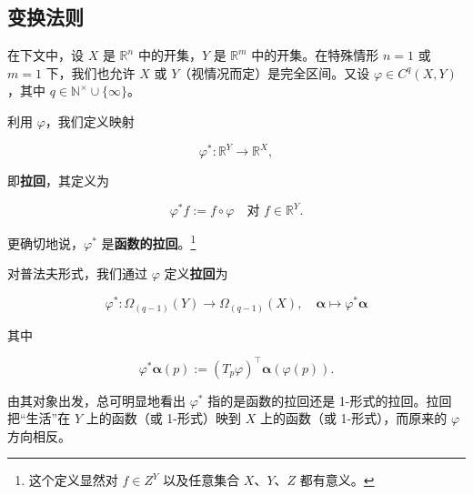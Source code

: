\subsection*{变换法则}

在下文中，设 $ X $ 是 $ \mathbb{R}^{n} $ 中的开集，$ Y $ 是 $ \mathbb{R}^{m} $ 中的开集。在特殊情形 $ n = 1 $ 或 $ m = 1 $ 下，我们也允许 $ X $ 或 $ Y $（视情况而定）是完全区间。又设 $ \varphi \in C^{q}(X,Y) $，其中 $ q \in \mathbb{N}^{\times} \cup \{\infty\} $。

利用 $ \varphi $，我们定义映射

\[
\varphi^{*} : \mathbb{R}^{Y} \to \mathbb{R}^{X} ,
\]

即\textbf{拉回}，其定义为

\[
\varphi^{*}f := f\circ\varphi \quad \text{对 } f \in \mathbb{R}^{Y} .
\]

更确切地说，$ \varphi^{*} $ 是\textbf{函数的拉回}。\footnote{这个定义显然对 $ f \in Z^{Y} $ 以及任意集合 $ X $、$ Y $、$ Z $ 都有意义。}

对普法夫形式，我们通过 $ \varphi $ 定义\textbf{拉回}为

\[
\varphi^{*} : \Omega_{(q-1)}(Y) \to \Omega_{(q-1)}(X) , \quad \boldsymbol{\alpha} \mapsto \varphi^{*}\boldsymbol{\alpha}
\]

其中

\[
\varphi^{*}\boldsymbol{\alpha}(p) := (T_{p}\varphi)^{\top}\boldsymbol{\alpha}(\varphi(p)) .
\]

由其对象出发，总可明显地看出 $ \varphi^{*} $ 指的是函数的拉回还是 1-形式的拉回。拉回把“生活”在 $ Y $ 上的函数（或 1-形式）映到 $ X $ 上的函数（或 1-形式），而原来的 $ \varphi $ 方向相反。

